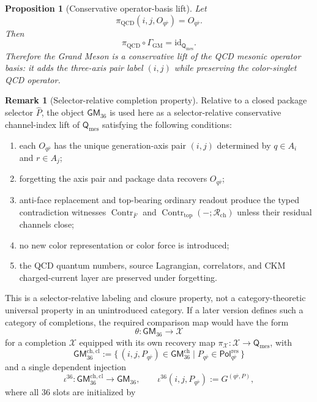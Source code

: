 \documentclass[11pt]{article}
\theoremstyle{definition}
\newtheorem{remark}[definition]{Remark}
\theoremstyle{plain}
\newtheorem{proposition}[definition]{Proposition}
\DeclareMathOperator{\Contr}{Contr}
\begin{document}
\begin{proposition}[Conservative operator-basis lift]
Let
\[
  \pi_{\mathrm{QCD}}(i,j,O_{q\bar r})=O_{q\bar r}.
\]
Then
\[
  \pi_{\mathrm{QCD}}\circ\Gamma_{\mathrm{GM}}
  =
  \mathrm{id}_{\mathsf Q_{\mathrm{mes}}}.
\]
Therefore the Grand Meson is a conservative lift of the QCD mesonic
operator basis: it adds the three-axis pair label \((i,j)\) while
preserving the color-singlet QCD operator.
\end{proposition}

\begin{remark}[Selector-relative completion property]
Relative to a closed package selector \(\widehat P\), the object
\(\mathsf{GM}_{36}\) is used here as a selector-relative conservative
channel-index lift of \(\mathsf Q_{\mathrm{mes}}\) satisfying the following
conditions:
\begin{enumerate}[label=(\roman*)]
  \item each \(O_{q\bar r}\) has the unique generation-axis pair
    \((i,j)\) determined by \(q\in A_i\) and \(r\in A_j\);
  \item forgetting the axis pair and package data recovers \(O_{q\bar r}\);
  \item anti-face replacement and top-bearing ordinary readout produce
    the typed contradiction witnesses \(\Contr_{\bar F}\) and
    \(\Contr_{\mathrm{top}}(-;\mathcal R_{\mathrm{ch}})\) unless their
    residual channels close;
  \item no new color representation or color force is introduced;
  \item the QCD quantum numbers, source Lagrangian, correlators, and CKM
    charged-current layer are preserved under forgetting.
\end{enumerate}
This is a selector-relative labeling and closure property, not a category-theoretic
universal property in an unintroduced category.  If a later version defines
such a category of completions, the required comparison map would have the
form
\[
  \theta:\mathsf{GM}_{36}\longrightarrow\mathcal X
\]
for a completion \(\mathcal X\) equipped with its own recovery map
\(\pi_{\mathcal X}:\mathcal X\to\mathsf Q_{\mathrm{mes}}\), with
\[
  \mathsf{GM}_{36}^{\mathrm{ch,cl}}
  :=
  \{\,(i,j,P_{q\bar r})\in\mathsf{GM}_{36}^{\mathrm{ch}}
  \mid P_{q\bar r}\in\mathsf{Pol}^{\mathrm{res}}_{q\bar r}\,\}
\]
and a single dependent injection
\[
  \iota^{36}:\mathsf{GM}_{36}^{\mathrm{ch,cl}}\to\mathsf{GM}_{36},
  \qquad
  \iota^{36}(i,j,P_{q\bar r})
  :=
  G^{(q\bar r,P)},
\]
where all \(36\) slots are initialized by

\end{remark}
\end{document}
